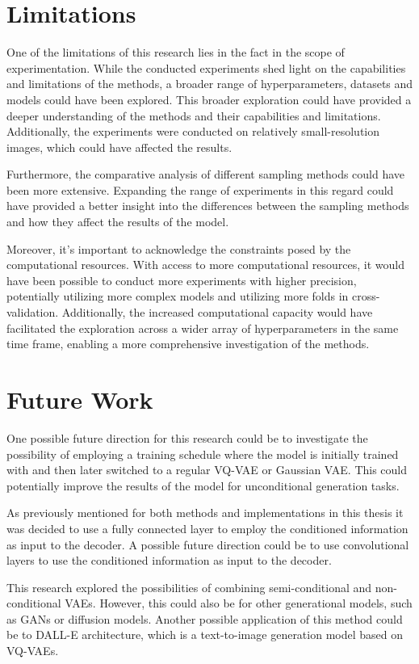 \section{Limitations}

One of the limitations of this research lies in the fact in the scope of experimentation. While the conducted experiments shed light on the capabilities and limitations of the methods, a broader range of hyperparameters, datasets and models could have been explored. This broader exploration could have provided a deeper understanding of the methods and their capabilities and limitations. Additionally, the experiments were conducted on relatively small-resolution images, which could have affected the results.

Furthermore, the comparative analysis of different sampling methods could have been more extensive. Expanding the range of experiments in this regard could have provided a better insight into the differences between the sampling methods and how they affect the results of the model.

Moreover, it's important to acknowledge the constraints posed by the computational resources. With access to more computational resources, it would have been possible to conduct more experiments with higher precision, potentially utilizing more complex models and utilizing more folds in cross-validation. Additionally, the increased computational capacity would have facilitated the exploration across a wider array of hyperparameters in the same time frame, enabling a more comprehensive investigation of the methods.

\section{Future Work}

One possible future direction for this research could be to investigate the possibility of employing a training schedule where the model is initially trained with  and then later switched to a regular VQ-VAE or Gaussian VAE. This could potentially improve the results of the model for unconditional generation tasks.

As previously mentioned for both methods and implementations in this thesis it was decided to use a fully connected layer to employ the conditioned information as input to the decoder. A possible future direction could be to use convolutional layers to use the conditioned information as input to the decoder.

This research explored the possibilities of combining semi-conditional and non-conditional VAEs. However, this could also be for other generational models, such as GANs or diffusion models. Another possible application of this method could be to DALL-E architecture, which is a text-to-image generation model based on VQ-VAEs.